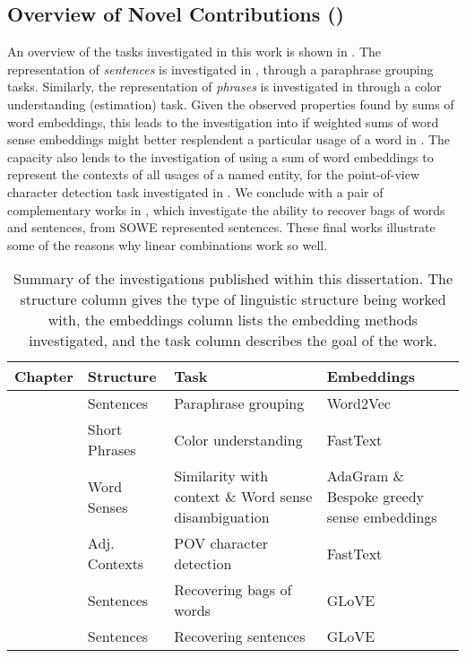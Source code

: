 \documentclass{book}
\begin{document}
\subsection*{Overview of Novel Contributions ()}
An overview of the tasks investigated in this work is shown in .
The representation of \emph{sentences} is investigated in , through a paraphrase grouping tasks.
Similarly, the representation of \emph{phrases} is investigated in  through a color understanding (estimation) task.
Given the observed properties found by sums of word embeddings,
this leads to the investigation into if weighted sums of word sense embeddings might better resplendent a particular usage of a word in .
The capacity also lends to the investigation of using a sum of word embeddings to represent the contexts of all usages of a named entity, for the point-of-view character detection task investigated in .
We conclude with a pair of complementary works in  , which investigate the ability to recover bags of words and sentences, from SOWE represented sentences.
These final works illustrate some of the reasons why linear combinations work so well.

\begin{table}
	\begin{tabularx}{\textwidth}{llXX}
		\toprule
		\textbf{Chapter} & \textbf{Structure} & \textbf{Task} & \textbf{Embeddings}\\
		\midrule
		\Cref{SentVecMeaning}  & Sentences & Paraphrase grouping &  Word2Vec \mbox{\citep{mikolovSkip}}\\
		\Cref{ColorEst} & Short Phrases & Color understanding & FastText \mbox{\citep{bojanowski2016enriching}}\\
		\Cref{RefittingSenses} & Word Senses & Similarity with context \& Word sense disambiguation %
			& AdaGram \mbox{\citep{AdaGrams}} \& Bespoke greedy sense embeddings\\
		\Cref{NovelPerspective} & Adj. Contexts & POV character detection & FastText \mbox{\citep{bojanowski2016enriching}}\\
		\Cref{BOWgen} & Sentences & Recovering bags of words & GLoVE \hspace{3cm} \citep{pennington2014glove} \\
		\Cref{SOWE2Sent} & Sentences & Recovering sentences & GLoVE  \hspace{3cm} \citep{pennington2014glove} \\
		\bottomrule
	\end{tabularx}
	\caption{Summary of the investigations published within this dissertation.
		The structure column gives the type of linguistic structure being worked with,
		the embeddings column lists the embedding methods investigated,
		and the task column describes the goal of the work.
		 \label{tbl:methodsandtasks}}
\end{table}
\end{document}
